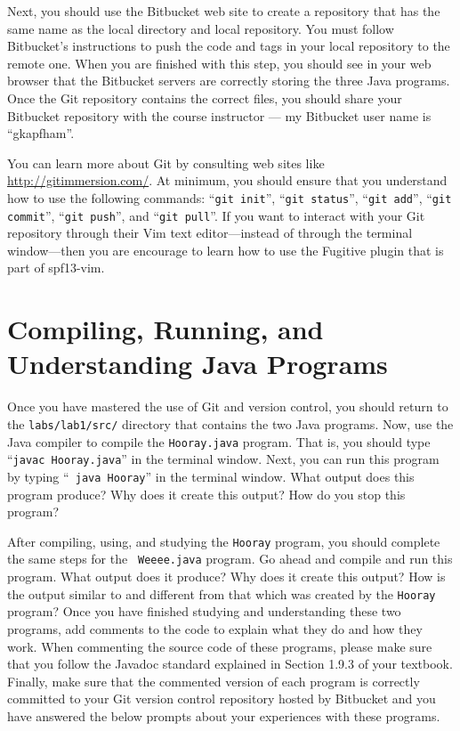 Next, you should use the Bitbucket web site to create a repository that has the same name as the local directory and
local repository.  You must follow Bitbucket's instructions to push the code and tags in your local repository to the
remote one. When you are finished with this step, you should see in your web browser that the Bitbucket servers are
correctly storing the three Java programs. Once the Git repository contains the correct files, you should share your
Bitbucket repository with the course instructor --- my Bitbucket user name is ``gkapfham''.

You can learn more about Git by consulting web sites like  \url{http://gitimmersion.com/}.  At minimum, you should
ensure that you understand how to use the following commands: ``{\tt git init}'', ``{\tt git status}'', ``{\tt git
add}'', ``{\tt git commit}'', ``{\tt git push}'', and ``{\tt git pull}''. If you want to interact with your Git
repository through their Vim text editor---instead of through the terminal window---then you are encourage to learn how
to use the Fugitive plugin that is part of spf13-vim.

\section*{Compiling, Running, and Understanding Java Programs}

Once you have mastered the use of Git and version control, you should return to the {\tt labs/lab1/src/} directory
that contains the two Java programs. Now, use the Java compiler to compile the {\tt Hooray.java} program.  That is,
you should type ``{\tt javac Hooray.java}'' in the terminal window.  Next, you can run this program by typing ``{\tt
java Hooray}'' in the terminal window.  What output does this program produce?  Why does it create this output? How
do you stop this program?

After compiling, using, and studying the {\tt Hooray} program, you should complete the same steps for the {\tt
Weeee.java} program. Go ahead and compile and run this program. What output does it produce? Why does it create this
output? How is the output similar to and different from that which was created by the {\tt Hooray} program? Once you
have finished studying and understanding these two programs, add comments to the code to explain what they do and how
they work. When commenting the source code of these programs, please make sure that you follow the Javadoc standard
explained in Section 1.9.3 of your textbook. Finally, make sure that the commented version of each program is correctly
committed to your Git version control repository hosted by Bitbucket and you have answered the below prompts about your
experiences with these programs.

